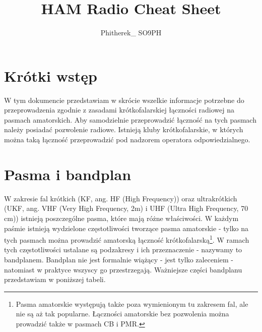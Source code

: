 \documentclass[a4paper,11pt]{article}
\author{Phitherek\_ SO9PH}
\title{HAM Radio Cheat Sheet}
\begin{document}
\maketitle
\tableofcontents
\section{Krótki wstęp}
W tym dokumencie przedstawiam w skrócie wszelkie informacje potrzebne do przeprowadzenia zgodnie z zasadami krótkofalarskiej łączności radiowej na pasmach amatorskich. Aby samodzielnie przeprowadzić łączność na tych pasmach należy posiadać pozwolenie radiowe. Istnieją kluby krótkofalarskie, w których można taką łączność przeprowadzić pod nadzorem operatora odpowiedzialnego.
\section{Pasma i bandplan}
W zakresie fal krótkich (KF, ang. HF (High Frequency)) oraz ultrakrótkich (UKF, ang. VHF (Very High Frequency, 2m) i UHF (Ultra High Frequency, 70 cm)) istnieją poszczególne pasma, które mają różne właściwości. W każdym paśmie istnieją wydzielone częstotliwości tworzące pasma amatorskie - tylko na tych pasmach można prowadzić amatorską łączność krótkofalarską\footnote{Pasma amatorskie występują także poza wymienionym tu zakresem fal, ale nie są aż tak popularne. Łączności amatorskie bez pozwolenia można prowadzić także w pasmach CB i PMR.}. W ramach tych częstotliwości ustalane są podzakresy i ich przeznaczenie - nazywamy to bandplanem. Bandplan nie jest formalnie wiążący - jest tylko zaleceniem - natomiast w praktyce wszyscy go przestrzegają. Ważniejsze części bandplanu przedstawiam w poniższej tabeli.
\end{document}
